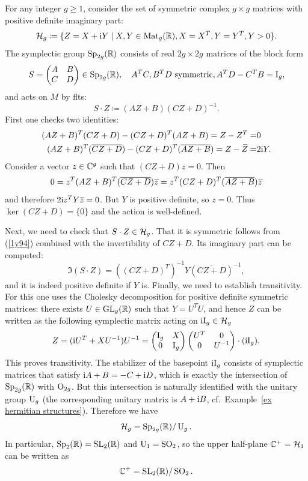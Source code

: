 \begin{example}\label{ex siegel upper half-space}
    For any integer $g\geq 1$, consider the set of symmetric complex $g\times g$ matrices with positive definite imaginary part:
    \[\mathcal{H}_g \coloneqq \{Z=X+\mathrm{i} Y\mid X,Y\in \operatorname{Mat}_g(\mathbb{R}), X=X^T, Y=Y^T, Y>0\}.\]
    The symplectic group $\operatorname{Sp}_{2g}(\mathbb{R})$ consists of real $2g\times 2g$ matrices of the block form 
    \[S=\begin{pmatrix}
        A & B\\
        C & D
    \end{pmatrix}\in\operatorname{Sp}_{2g}(\mathbb{R}),\quad A^T C,B^TD\text{ symmetric}, A^TD-C^TB=\mathrm{I}_g,\]
    and acts on $M$ by \glspl{flt}:
    \[S\cdot Z\coloneqq (AZ+B)(CZ+D)^{-1}.\]
    First one checks two identities:
    \begin{align}
        (AZ+B)^T (CZ+D)-(CZ+D)^T(AZ+B)=Z-Z^T=&0\label{1y94}\\
        (AZ+B)^T (\overline{CZ+D})-(CZ+D)^T(\overline{AZ+B})=Z-\wb{Z}=&2\i Y.\label{13702}
    \end{align}
    Consider a vector $z\in\mathbb{C}^g$ such that $(CZ+D)z=0$. Then 
    \[0=z^T (AZ+B)^T(\overline{CZ+D})\wb{z}=z^T (CZ+D)^T(\overline{AZ+B})\wb{z}\]
    and therefore $2\i z^T Y \wb{z}=0$. But $Y$ is positive definite, so $z=0$. Thus $\ker(CZ+D)=\{0\}$ and the action is well-defined.

    Next, we need to check that $S\cdot Z\in \mathcal{H}_g$. That it is symmetric follows from (\ref{1y94}) combined with the invertibility of $CZ+D$. Its imaginary part can be computed:
    \[\Im (S\cdot Z)=((CZ+D)^T)^{-1}Y(\overline{CZ+D})^{-1},\]
    and it is indeed positive definite if $Y$ is. Finally, we need to establish transitivity. For this one uses the Cholesky decomposition for positive definite symmetric matrices: there exists $U\in\operatorname{GL}_g(\mathbb{R})$ such that $Y=U^TU$, and hence $Z$ can be written as the following symplectic matrix acting on $\mathrm{i} \mathrm{I}_g\in \mathcal{H}_g$
    \[Z=(\mathrm{i} U^T+XU^{-1})U^{-1}=\begin{pmatrix}
        \mathrm{I}_g & X\\
        0 & \mathrm{I}_g
    \end{pmatrix}\begin{pmatrix}
        U^T & 0\\
        0 & U^{-1}
    \end{pmatrix}\cdot(\mathrm{i} \mathrm{I}_g).\]
    This proves transitivity. The stabilizer of the basepoint $\mathrm{i} \mathrm{I}_g$ consists of symplectic matrices that satisfy $\mathrm{i} A+B=-C+\mathrm{i} D$, which is exactly the intersection of $\operatorname{Sp}_{2g}(\mathbb{R})$ with $\operatorname{O}_{2g}$. But this intersection is naturally identified with the unitary group $\operatorname{U}_g$ (the corresponding unitary matrix is $A+\mathrm{i} B$, cf.\ Example~\ref{ex hermitian structures}). Therefore we have 
    \[\mathcal{H}_g = \operatorname{Sp}_{2g}(\mathbb{R})\slash \operatorname{U}_g.\]
    In particular, $\operatorname{Sp}_2(\mathbb{R})=\operatorname{SL}_2(\mathbb{R})$ and $\operatorname{U}_1=\operatorname{SO}_2$, so the upper half-plane $\mathbb{C}^+=\mathcal{H}_1$ can be written as 
    \[\mathbb{C}^+=\operatorname{SL}_2(\mathbb{R})\slash \operatorname{SO}_2.\]
\end{example}
